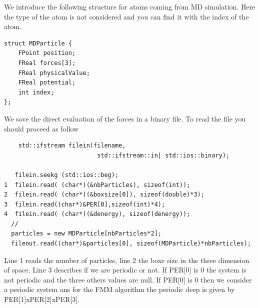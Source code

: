 \documentclass[12pt]{article} %
\begin{document}
We introduce the following structure for atoms coming from MD simulation. Here the type of the atom is not considered and you can find it with the index of the atom. 
\begin{verbatim}
struct MDParticle {
	FPoint position;
	FReal forces[3];
	FReal physicalValue;
	FReal potential;
	int index;
};
\end{verbatim}
We save the direct evaluation of the forces in a binary file. To read the file you should proceed as follow
\begin{verbatim}
	std::ifstream filein(filename,
	                      std::ifstream::in| std::ios::binary);

   filein.seekg (std::ios::beg);
1  filein.read( (char*)(&nbParticles), sizeof(int));
2  filein.read( (char*)(&boxsize[0]), sizeof(double)*3);
3  filein.read((char*)&PER[0],sizeof(int)*4);
4  filein.read( (char*)(&denergy), sizeof(denergy));
  //
  particles = new MDParticle[nbParticles*2];
  fileout.read((char*)&particles[0], sizeof(MDParticle)*nbParticles);
\end{verbatim}
Line 1 reads the number of particles, line 2 the boxe size in the three dimension of space. Line 3 describes if we are periodic or not. If PER[0] is $0$ the system is not periodic and the three others values are null. If PER[0] is $0$ then we consider a periodic system ans for the FMM algorithm the periodic deep is given by  PER[1]xPER[2]xPER[3].
\end{document}
